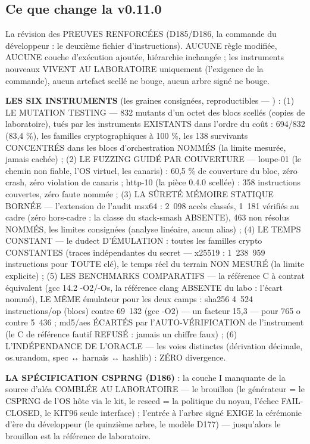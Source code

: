 \subsection{Ce que change la v0.11.0}\label{sec:nouveautes110}

La révision des PREUVES RENFORCÉES (D185/D186, la commande du développeur :
le deuxième fichier d'instructions). AUCUNE règle modifiée, AUCUNE couche
d'exécution ajoutée, hiérarchie inchangée ; les instruments nouveaux
VIVENT AU LABORATOIRE uniquement (l'exigence de la commande), aucun
artefact scellé ne bouge, aucun arbre signé ne bouge.

\textbf{LES SIX INSTRUMENTS} (les graines consignées, reproductibles —
) : (1) LE MUTATION TESTING — 832 mutants
d'un octet des blocs scellés (copies de laboratoire), tués par les
instruments EXISTANTS dans l'ordre du coût : 694/832 (83,4 \%), les
familles cryptographiques à 100 \%, les 138 survivants CONCENTRÉS dans
les blocs d'orchestration NOMMÉS (la limite mesurée, jamais cachée) ;
(2) LE FUZZING GUIDÉ PAR COUVERTURE — loupe-01 (le chemin non fiable,
l'OS virtuel, les canaris) : 60,5 \% de couverture du bloc, zéro crash,
zéro violation de canaris ; http-10 (la pièce 0.4.0 scellée) : 358
instructions couvertes, zéro faute nommée ; (3) LA SÛRETÉ MÉMOIRE
STATIQUE BORNÉE — l'extension de l'audit msx64 : 2~098 accès classés,
1~181 vérifiés au cadre (zéro hors-cadre : la classe du stack-smash
ABSENTE), 463 non résolus NOMMÉS, les limites consignées (analyse
linéaire, aucun alias) ; (4) LE TEMPS CONSTANT — le dudect
D'ÉMULATION : toutes les familles crypto CONSTANTES (traces
indépendantes du secret — x25519 : 1~238~959 instructions pour TOUTE
clé), le temps réel du terrain NON MESURÉ (la limite explicite) ;
(5) LES BENCHMARKS COMPARATIFS — la référence C à contrat équivalent
(gcc 14.2 -O2/-Os, la référence clang ABSENTE du labo : l'écart nommé),
LE MÊME émulateur pour les deux camps : sha256 4~524 instructions/op
(blocs) contre 69~132 (gcc -O2) — un facteur 15,3 — pour 765 o contre
5~436 ; md5/aes ÉCARTÉS par l'AUTO-VÉRIFICATION de l'instrument (le C
de référence fautif REFUSÉ : jamais un chiffre faux) ; (6)
L'INDÉPENDANCE DE L'ORACLE — les voies distinctes (dérivation décimale,
os.urandom, spec ↔ harnais ↔ hashlib) : ZÉRO divergence.

\textbf{LA SPÉCIFICATION CSPRNG (D186)} : la couche I manquante de la
source d'aléa COMBLÉE AU LABORATOIRE — le brouillon
 (le générateur = le CSPRNG de l'OS
hôte via le kit, le reseed = la politique du noyau, l'échec
FAIL-CLOSED, le KIT96 seule interface) ; l'entrée à l'arbre signé
EXIGE la cérémonie d'ère du développeur (le quinzième arbre, le modèle
D177) — jusqu'alors le brouillon est la référence de laboratoire.

